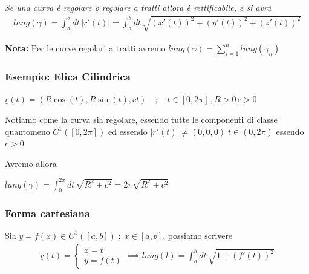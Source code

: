 \bigskip

\textit{Se una curva è regolare o regolare a tratti allora è rettificabile, e si avrà}
\begin{align}
lung(\gamma)=\int_{a}^{b} dt \, |r'(t)|= \int_{a}^{b} dt \, \sqrt{(x'(t))^2 + (y'(t))^2 + (z'(t))^2}
\end{align}

\textbf{Nota:} Per le curve regolari a tratti avremo $lung(\gamma)=\sum_{i=1}^{n}lung(\gamma_n)$

\bigskip

\subsubsection{Esempio: Elica Cilindrica}

$\underline{r}(t)=(R\cos(t), R\sin(t), ct) \quad; \quad t\in[0,2\pi] \, , R>0 \, c>0$

Notiamo come la curva sia regolare, essendo tutte le componenti di classe quantomeno $C^1([0,2\pi])$ ed essendo $|r'(t)|\neq (0,0,0) \; t\in(0,2\pi)$ essendo $c>0$

Avremo allora 
\bigskip

$lung(\gamma)=\int_{0}^{2\pi} dt \, \sqrt{R^2 + c^2}= 2\pi\sqrt{R^2 + c^2}$

\newpage

\subsubsection{Forma cartesiana}

Sia $y=f(x)\in C^1([a,b]) \; ; \; x\in[a,b]$, possiamo scrivere
\begin{align}
\underline{r}(t)=\left\{
\begin{array}{cc}
x=t \quad \;\,\\
y=f(t)
\end{array}
\right. \implies
lung(l)= \int_{a}^{b} dt \, \sqrt{1+ (f'(t))^2}
\end{align}

